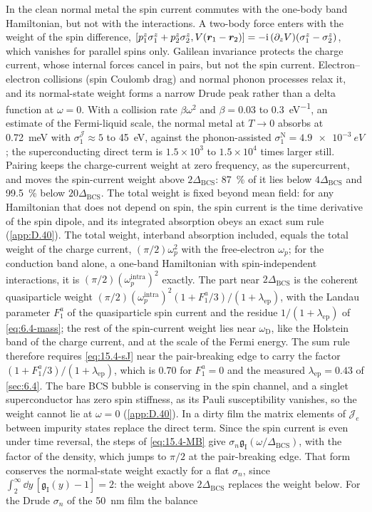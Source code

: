 \noindent In the clean normal metal the spin current commutes with the one-body band Hamiltonian, but not with the interactions. A two-body force enters with the weight of the spin difference, $[p^z_1\sigma^z_1 + p^z_2\sigma^z_2, V(\bm{r}_1 - \bm{r}_2)] = -\mathrm{i}\,(\partial_zV)(\sigma^z_1 - \sigma^z_2)$, which vanishes for parallel spins only. Galilean invariance protects the charge current, whose internal forces cancel in pairs, but not the spin current. Electron--electron collisions (spin Coulomb drag) and normal phonon processes relax it, and its normal-state weight forms a narrow Drude peak rather than a delta function at $\omega = 0$. With a collision rate $\beta\omega^2$ and $\beta = 0.03$ to \SI{0.3}{eV^{-1}}, an estimate of the Fermi-liquid scale, the normal metal at $T \to 0$ absorbs at \SI{0.72}{meV} with $\sigma_1^{\mathcal{J}} \approx 5$ to \SI{45}{eV}, against the phonon-assisted $\sigma_1^{\mathrm{N}} = \SI{4.9e-3}{eV}$; the superconducting direct term is $1.5\times10^3$ to $1.5\times10^4$ times larger still. Pairing keeps the charge-current weight at zero frequency, as the supercurrent, and moves the spin-current weight above $2\Delta_{\mathrm{BCS}}$: \SI{87}{\percent} of it lies below $4\Delta_{\mathrm{BCS}}$ and \SI{99.5}{\percent} below $20\Delta_{\mathrm{BCS}}$. The total weight is fixed beyond mean field: for any Hamiltonian that does not depend on spin, the spin current is the time derivative of the spin dipole, and its integrated absorption obeys an exact sum rule (\cref{app:D.40}). The total weight, interband absorption included, equals the total weight of the charge current, $(\pi/2)\omega_p^2$ with the free-electron $\omega_p$; for the conduction band alone, a one-band Hamiltonian with spin-independent interactions, it is $(\pi/2)(\omega_p^{\mathrm{intra}})^2$ exactly. The part near $2\Delta_{\mathrm{BCS}}$ is the coherent quasiparticle weight $(\pi/2)(\omega_p^{\mathrm{intra}})^2(1 + F_1^a/3)/(1 + \lambda_{\mathrm{ep}})$, with the Landau parameter $F_1^a$ of the quasiparticle spin current and the residue $1/(1 + \lambda_{\mathrm{ep}})$ of \cref{eq:6.4-mass}; the rest of the spin-current weight lies near $\omega_{\mathrm{D}}$, like the Holstein band of the charge current, and at the scale of the Fermi energy. The sum rule therefore requires \cref{eq:15.4-sJ} near the pair-breaking edge to carry the factor $(1 + F_1^a/3)/(1 + \lambda_{\mathrm{ep}})$, which is 0.70 for $F_1^a = 0$ and the measured $\lambda_{\mathrm{ep}} = 0.43$ of \cref{sec:6.4}. The bare BCS bubble is conserving in the spin channel, and a singlet superconductor has zero spin stiffness, as its Pauli susceptibility vanishes, so the weight cannot lie at $\omega = 0$ (\cref{app:D.40}). In a dirty film the matrix elements of $\mathcal{J}_e$ between impurity states replace the direct term. Since the spin current is even under time reversal, the steps of \cref{eq:15.4-MB} give $\sigma_n\mathfrak{g}_{\mathrm{I}}(\omega/\Delta_{\mathrm{BCS}})$, with the factor of the density, which jumps to $\pi/2$ at the pair-breaking edge. That form conserves the normal-state weight exactly for a flat $\sigma_n$, since $\int_2^\infty\dd y\,[\mathfrak{g}_{\mathrm{I}}(y) - 1] = 2$: the weight above $2\Delta_{\mathrm{BCS}}$ replaces the weight below. For the Drude $\sigma_n$ of the \SI{50}{nm} film the balance 